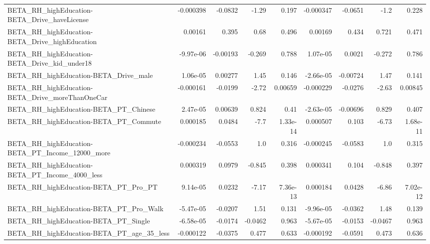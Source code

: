 \begin{tabular}{lrrrrrrrr}
BETA\_RH\_highEducation-BETA\_Drive\_haveLicense       &   -0.000398 &      -0.0832 &     -1.29 &    0.197 &  -0.000347 &     -0.0651 &         -1.2 &         0.228 \\
BETA\_RH\_highEducation-BETA\_Drive\_highEducation     &     0.00161 &        0.395 &      0.68 &    0.496 &    0.00169 &       0.434 &        0.721 &         0.471 \\
BETA\_RH\_highEducation-BETA\_Drive\_kid\_under18       &   -9.97e-06 &     -0.00193 &    -0.269 &    0.788 &   1.07e-05 &      0.0021 &       -0.272 &         0.786 \\
BETA\_RH\_highEducation-BETA\_Drive\_male              &    1.06e-05 &      0.00277 &      1.45 &    0.146 &  -2.66e-05 &    -0.00724 &         1.47 &         0.141 \\
BETA\_RH\_highEducation-BETA\_Drive\_moreThanOneCar    &   -0.000161 &      -0.0199 &     -2.72 &  0.00659 &  -0.000229 &     -0.0276 &        -2.63 &       0.00845 \\
BETA\_RH\_highEducation-BETA\_PT\_Chinese              &    2.47e-05 &      0.00639 &     0.824 &     0.41 &  -2.63e-05 &    -0.00696 &        0.829 &         0.407 \\
BETA\_RH\_highEducation-BETA\_PT\_Commute              &    0.000185 &       0.0484 &      -7.7 & 1.33e-14 &   0.000507 &       0.103 &        -6.73 &      1.68e-11 \\
BETA\_RH\_highEducation-BETA\_PT\_Income\_12000\_more    &   -0.000234 &      -0.0553 &       1.0 &    0.316 &  -0.000245 &     -0.0583 &          1.0 &         0.315 \\
BETA\_RH\_highEducation-BETA\_PT\_Income\_4000\_less     &    0.000319 &       0.0979 &    -0.845 &    0.398 &   0.000341 &       0.104 &       -0.848 &         0.397 \\
BETA\_RH\_highEducation-BETA\_PT\_Pro\_PT               &    9.14e-05 &       0.0232 &     -7.17 & 7.36e-13 &   0.000184 &      0.0428 &        -6.86 &      7.02e-12 \\
BETA\_RH\_highEducation-BETA\_PT\_Pro\_Walk             &   -5.47e-05 &      -0.0207 &      1.51 &    0.131 &  -9.96e-05 &     -0.0362 &         1.48 &         0.139 \\
BETA\_RH\_highEducation-BETA\_PT\_Single               &   -6.58e-05 &      -0.0174 &   -0.0462 &    0.963 &  -5.67e-05 &     -0.0153 &      -0.0467 &         0.963 \\
BETA\_RH\_highEducation-BETA\_PT\_age\_35\_less          &   -0.000122 &      -0.0375 &     0.477 &    0.633 &  -0.000192 &     -0.0591 &        0.473 &         0.636 \\

\end{tabular}
